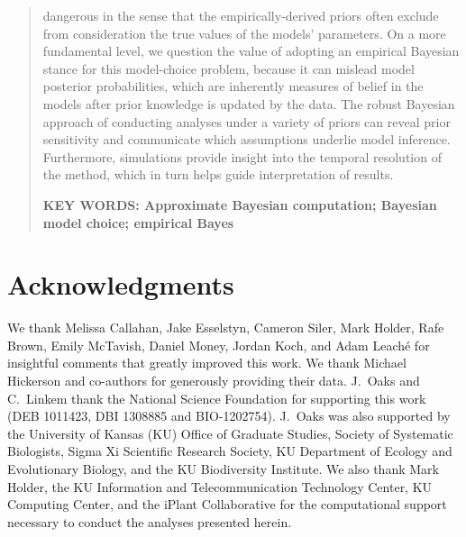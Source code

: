 \documentclass[letterpaper,12pt]{article}
\begin{document}
\begin{abstract}
    dangerous in the sense that the empirically-derived priors often
    exclude from consideration the true values of the models' parameters.
    On a more fundamental level, we question the value of adopting an empirical
    Bayesian stance for this model-choice problem, because it can mislead model
    posterior probabilities, which are inherently measures of belief in the
    models after prior knowledge is updated by the data.
    The robust Bayesian approach of conducting analyses under a variety
    of priors can reveal prior sensitivity and communicate which assumptions
    underlie model inference.
    Furthermore, simulations provide insight into the temporal resolution of
    the method, which in turn helps guide interpretation of results.

    \vspace{12pt}
    \noindent\textbf{KEY WORDS: Approximate Bayesian computation; Bayesian
        model choice; empirical Bayes} 
\end{abstract}

\newpage



\section{Acknowledgments}
We thank Melissa Callahan, Jake Esselstyn, Cameron Siler, Mark Holder, Rafe
Brown, Emily McTavish, Daniel Money, Jordan Koch, and Adam Leach\'{e} for
insightful comments that greatly improved this work.
We thank Michael Hickerson and co-authors for generously providing their data.
J.\ Oaks and C.\ Linkem thank the National Science Foundation for supporting
this work (DEB 1011423, DBI 1308885 and BIO-1202754).
J.\ Oaks was also supported by the University of Kansas (KU) Office of Graduate
Studies, Society of Systematic Biologists, Sigma Xi Scientific Research
Society, KU Department of Ecology and Evolutionary Biology, and the KU
Biodiversity Institute.
We also thank Mark Holder, the KU Information and Telecommunication Technology
Center, KU Computing Center, and the iPlant Collaborative for the computational
support necessary to conduct the analyses presented herein.



\newpage
\singlespacing

\renewcommand\listfigurename{Figure Captions}
\renewcommand\cftdotsep{\cftnodots}
\setlength\cftbeforefigskip{10pt}
\listoffigures
\end{document}
